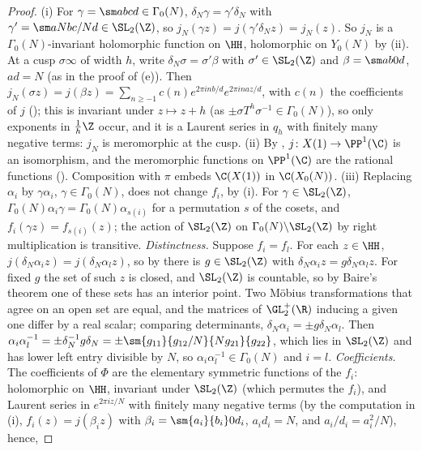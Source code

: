 \begin{proof}
(i) For $\gamma=\sm abcd\in\Gamma_0(N)$, $\delta_N\gamma=\gamma'\delta_N$ with $\gamma'=\sm a{Nb}{c/N}d\in\SL_2(\Z)$, so $j_N(\gamma z)=j(\gamma'\delta_Nz)=j_N(z)$. So $j_N$ is a
$\Gamma_0(N)$-invariant holomorphic function on $\HH$, holomorphic on $Y_0(N)$ by (ii). At a cusp $\sigma\infty$ of width $h$, write $\delta_N\sigma=\sigma'\beta$ with
$\sigma'\in\SL_2(\Z)$ and $\beta=\sm ab0d$, $ad=N$ (as in the proof of (e)). Then $j_N(\sigma z)=j(\beta z)=\sum_{n\ge-1}c(n)e^{2\pi inb/d}e^{2\pi inaz/d}$, with $c(n)$ the
coefficients of $j$ (); this is invariant under $z\mapsto z+h$ (as $\pm\sigma T^h\sigma^{-1}\in\Gamma_0(N)$), so only exponents in $\frac1h\Z$ occur, and it is a Laurent
series in $q_h$ with finitely many negative terms: $j_N$ is meromorphic at the cusp.
(ii) By , $j\colon X(1)\to\PP^1(\C)$ is an isomorphism, and the meromorphic functions on $\PP^1(\C)$ are the rational functions ().
Composition with $\pi$ embeds $\C(X(1))$ in $\C(X_0(N))$.
(iii) Replacing $\alpha_i$ by $\gamma\alpha_i$, $\gamma\in\Gamma_0(N)$, does not change $f_i$, by (i). For $\gamma\in\SL_2(\Z)$, $\Gamma_0(N)\alpha_i\gamma=\Gamma_0(N)\alpha_{s(i)}$ for a permutation $s$
of the cosets, and $f_i(\gamma z)=f_{s(i)}(z)$; the action of $\SL_2(\Z)$ on $\Gamma_0(N)\backslash\SL_2(\Z)$ by right multiplication is transitive.
\emph{Distinctness.} Suppose $f_i=f_l$. For each $z\in\HH$, $j(\delta_N\alpha_iz)=j(\delta_N\alpha_lz)$, so by  there is $g\in\SL_2(\Z)$ with
$\delta_N\alpha_iz=g\delta_N\alpha_lz$. For fixed $g$ the set of such $z$ is closed, and $\SL_2(\Z)$ is countable, so by Baire's theorem one of these sets has an interior point. Two
M\"obius transformations that agree on an open set are equal, and the matrices of $\GL_2^+(\R)$ inducing a given one differ by a real scalar; comparing determinants, $\delta_N\alpha_i=\pm g\delta_N\alpha_l$.
Then $\alpha_i\alpha_l^{-1}=\pm\delta_N^{-1}g\delta_N=\pm\sm{g_{11}}{g_{12}/N}{Ng_{21}}{g_{22}}$, which lies in $\SL_2(\Z)$ and has lower left entry divisible by $N$, so $\alpha_i\alpha_l^{-1}\in\Gamma_0(N)$
and $i=l$.
\emph{Coefficients.} The coefficients of $\Phi$ are the elementary symmetric functions of the $f_i$: holomorphic on $\HH$, invariant under $\SL_2(\Z)$ (which permutes the $f_i$), and
Laurent series in $e^{2\pi iz/N}$ with finitely many negative terms (by the computation in (i), $f_i(z)=j(\beta_iz)$ with $\beta_i=\sm{a_i}{b_i}0{d_i}$, $a_id_i=N$, and $a_i/d_i=a_i^2/N$), hence,

\end{proof}
